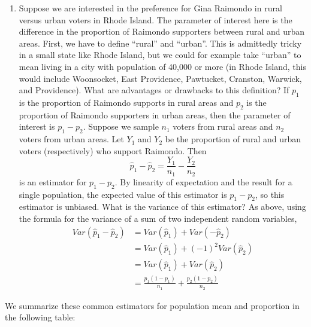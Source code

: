 \documentclass[notes.tex]{subfiles}
\begin{document}
\begin{enumerate}
\item Suppose we are interested in the preference for Gina Raimondo in rural versus urban voters in Rhode Island. The parameter of interest here is the difference in the proportion of Raimondo supporters between rural and urban areas. First, we have to define ``rural'' and ``urban''. This is admittedly tricky in a small state like Rhode Island, but we could for example take ``urban'' to mean living in a city with population of 40,000 or more (in Rhode Island, this would include Woonsocket, East Providence, Pawtucket, Cranston, Warwick, and Providence). What are advantages or drawbacks to this definition? If $p_1$ is the proportion of Raimondo supports in rural areas and $p_2$ is the proportion of Raimondo supporters in urban areas, then the parameter of interest is $p_1 - p_2$. Suppose we sample $n_1$ voters from rural areas and $n_2$ voters from urban areas. Let $Y_1$ and $Y_2$ be the proportion of rural and urban voters (respectively) who support Raimondo. Then
\[
\hat{p}_1 - \hat{p}_2 = \frac{Y_1}{n_1} - \frac{Y_2}{n_2}
\]
is an estimator for $p_1 - p_2$. By linearity of expectation and the result for a single population, the expected value of this estimator is $p_1 - p_2$, so this estimator is unbiased. What is the variance of this estimator? As above, using the formula for the variance of a sum of two independent random variables,
\begin{align*}
Var(\hat{p}_1 - \hat{p}_2 ) &= Var(\hat{p}_1) + Var(- \hat{p}_2) \\
&= Var(\hat{p}_1) + (-1)^2 Var(\hat{p}_2)\\
&= Var(\hat{p}_1) + Var(\hat{p}_2) \\
&= \frac{p_1(1-p_1)}{n_1} + \frac{p_2(1-p_2)}{n_2}
\end{align*}
\end{enumerate}

We summarize these common estimators for population mean and proportion in the following table:
\end{document}
